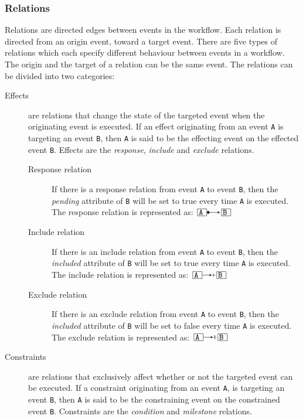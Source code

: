 \documentclass{article}
\begin{document}
			\subsubsection*{Relations}

			Relations are directed edges between events in the workflow.
			Each relation is directed from an origin event, toward a target event.
			There are five types of relations which each specify different behaviour between events in a workflow.
			The origin and the target of a relation can be the same event.
			The relations can be divided into two categories:

			\begin{description}
				\item[Effects] are relations that change the state of the targeted event when the originating event is executed.
				If an effect originating from an event \texttt{A} is targeting an event \texttt{B}, then \texttt{A} is said to be the effecting event on the effected event \texttt{B}.
				Effects are the \emph{response}, \emph{include} and \emph{exclude} relations.
				\begin{description}
					\item[Response relation] If there is a response relation from event \texttt{A} to event \texttt{B}, then the \textit{pending} attribute of \texttt{B} will be set to true every time \texttt{A} is executed.
				The response relation is represented as: $\ev{A} \rrel \ev{B}$
					\item[Include relation] If there is an include relation from event \texttt{A} to event \texttt{B}, then the \textit{included} attribute of \texttt{B} will be set to true every time \texttt{A} is executed.
				The include relation is represented as: $\ev{A} \irel \ev{B}$
					\item[Exclude relation] If there is an exclude relation from event \texttt{A} to event \texttt{B}, then the \textit{included} attribute of \texttt{B} will be set to false every time \texttt{A} is executed.
				The exclude relation is represented as: $\ev{A} \erel \ev{B}$
				\end{description}
				\item[Constraints] are relations that exclusively affect whether or not the targeted event can be executed.
				If a constraint originating from an event \texttt{A}, is targeting an event \texttt{B}, then \texttt{A} is said to be the constraining event on the constrained event \texttt{B}.
				Constraints are the \emph{condition} and \emph{milestone} relations.
				\begin{description}

\end{description}
\end{description}
\end{document}

